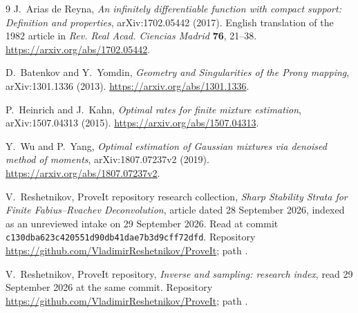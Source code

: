 \documentclass[11pt,a4paper]{article}
\numberwithin{equation}{section}
\theoremstyle{definition}
\theoremstyle{remark}
\begin{document}
\begin{thebibliography}{9}
J.~Arias de Reyna,
\emph{An infinitely differentiable function with compact support: Definition
and properties}, arXiv:1702.05442 (2017).
English translation of the 1982 article in
\emph{Rev. Real Acad. Ciencias Madrid} \textbf{76}, 21--38.
\url{https://arxiv.org/abs/1702.05442}.

D.~Batenkov and Y.~Yomdin,
\emph{Geometry and Singularities of the Prony mapping},
arXiv:1301.1336 (2013).
\url{https://arxiv.org/abs/1301.1336}.

P.~Heinrich and J.~Kahn,
\emph{Optimal rates for finite mixture estimation},
arXiv:1507.04313 (2015).
\url{https://arxiv.org/abs/1507.04313}.

Y.~Wu and P.~Yang,
\emph{Optimal estimation of Gaussian mixtures via denoised method of moments},
arXiv:1807.07237v2 (2019).
\url{https://arxiv.org/abs/1807.07237v2}.

V.~Reshetnikov, ProveIt repository research collection,
\emph{Sharp Stability Strata for Finite Fabius--Rvachev Deconvolution},
article dated 28 September 2026, indexed as an unreviewed intake on
29 September 2026. Read at commit
\texttt{c130dba623c420551d90db41dae7b3d9cff72dfd}.
Repository \url{https://github.com/VladimirReshetnikov/ProveIt}; path
.

V.~Reshetnikov, ProveIt repository,
\emph{Inverse and sampling: research index}, read 29 September 2026 at the
same commit. Repository \url{https://github.com/VladimirReshetnikov/ProveIt};
path
.
\end{thebibliography}
\end{document}
